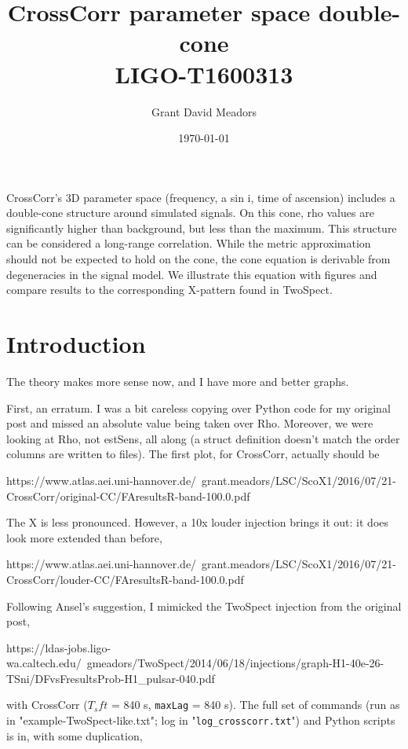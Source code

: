 \documentclass{article}
\begin{document}
\title{CrossCorr parameter space double-cone \\ 
LIGO-T1600313}
\author{Grant David Meadors}
\date{\today}

\maketitle

CrossCorr's 3D parameter space (frequency, a sin i, time of ascension) includes a double-cone structure around simulated signals. On this cone, rho values are significantly higher than background, but less than the maximum. This structure can be considered a long-range correlation. While the metric approximation should not be expected to hold on the cone, the cone equation is derivable from degeneracies in the signal model. We illustrate this equation with figures and compare results to the corresponding X-pattern found in TwoSpect.

\section{Introduction}


The theory makes more sense now, and I have more and better graphs.

First, an erratum. I was a bit careless copying over Python code for my
original post and missed an absolute value being taken over Rho.
Moreover, we were looking at Rho, not estSens, all along (a struct
definition doesn't match the order columns are written to files). The
first plot, for CrossCorr, actually should be

https://www.atlas.aei.uni-hannover.de/~grant.meadors/LSC/ScoX1/2016/07/21-CrossCorr/original-CC/FAresultsR-band-100.0.pdf

The X is less pronounced. However, a 10x louder injection brings it out:
it does look more extended than before,

https://www.atlas.aei.uni-hannover.de/~grant.meadors/LSC/ScoX1/2016/07/21-CrossCorr/louder-CC/FAresultsR-band-100.0.pdf

Following Ansel's suggestion, I mimicked the TwoSpect injection from the
original post,

https://ldas-jobs.ligo-wa.caltech.edu/~gmeadors/TwoSpect/2014/06/18/injections/graph-H1-40e-26-TSni/DFvsFresultsProb-H1\_pulsar-040.pdf

with CrossCorr ($T_sft$ = 840 s, \texttt{maxLag} = 840 s). The full set of commands
(run as in "example-TwoSpect-like.txt"; log in "\texttt{log\_crosscorr.txt}") and
Python scripts is in, with some duplication,
\end{document}
